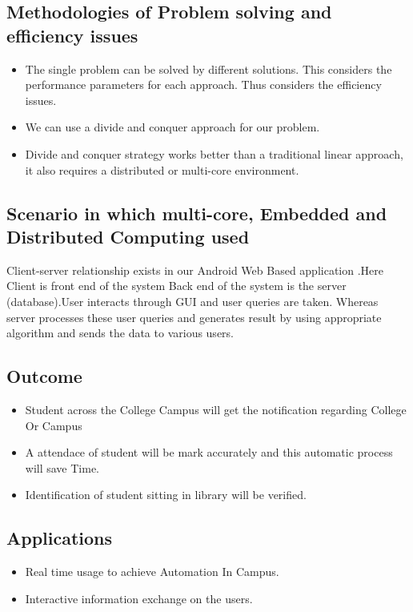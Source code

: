\documentclass[10pt,a4paper]
{article}
\numberwithin{table}{section}
\begin{document}
{{\begin{normalsize}
\subsection{Methodologies of Problem solving and efficiency issues}
\begin{itemize}
\item The single problem can be solved by different solutions.  This considers the performance parameters for each approach. Thus considers the efficiency issues.
\item We can use a divide and conquer approach for our problem.
\item Divide and conquer strategy works better than a traditional linear approach, it also requires a distributed or multi-core environment.
\end{itemize}

\subsection{Scenario in which multi-core, Embedded and Distributed Computing used}
\hspace*{0.3cm}Client-server relationship exists in our Android Web Based application .Here Client is front end of the system Back end of the system is the server (database).User interacts through GUI and user queries are taken. Whereas server processes these user queries and generates result by using appropriate algorithm and sends the data to various users.


\subsection{Outcome}
\begin{itemize}
\item  Student across the College Campus will get the notification  regarding College Or Campus
\item	A attendace of student will be mark accurately and this automatic process will save Time. 
\item	Identification of student sitting in library will be verified.
\end{itemize}


\subsection{Applications}
\begin{itemize}
\item Real time usage to achieve Automation In Campus.
\item Interactive information exchange on the users. 
\end{itemize}


\end{normalsize}}}
\end{document}

